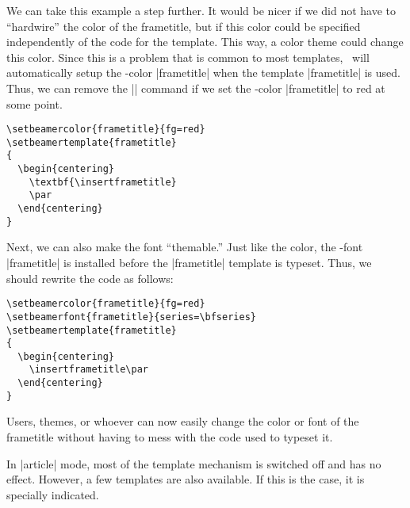 We can take this example a step further. It would be nicer if we did
not have to ``hardwire'' the color of the frametitle, but if this
color could be specified independently of the code for the
template. This way, a color theme could change this color. Since this
is a problem that is common to most templates, \beamer\ will
automatically setup the \beamer-color |frametitle| when the template
|frametitle| is used. Thus, we can remove the |\color{red}| command if
we set the \beamer-color |frametitle| to red at some point.
\begin{verbatim}
\setbeamercolor{frametitle}{fg=red}
\setbeamertemplate{frametitle}
{
  \begin{centering}
    \textbf{\insertframetitle}
    \par
  \end{centering}
}
\end{verbatim}
Next, we can also make the font ``themable.'' Just like the color, the
\beamer-font |frametitle| is installed before the |frametitle|
template is typeset. Thus, we should rewrite the code as follows:
\begin{verbatim}
\setbeamercolor{frametitle}{fg=red}
\setbeamerfont{frametitle}{series=\bfseries}
\setbeamertemplate{frametitle}
{
  \begin{centering}
    \insertframetitle\par
  \end{centering}
}
\end{verbatim}
Users, themes, or whoever can now easily change the color or font of
the frametitle without having to mess with the code used to typeset
it.

\articlenote
In |article| mode, most of the template mechanism is switched off and
has no effect. However, a few templates are also available. If this is
the case, it is specially indicated.
\smallskip

